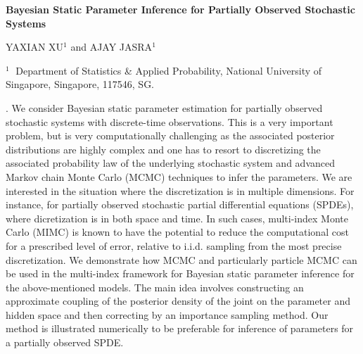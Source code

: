 \documentclass[10.9pt]{article}
\begin{document}
\begin{flushleft}


{\LARGE\bf Bayesian Static Parameter Inference for Partially Observed Stochastic Systems}


\vspace{1.0cm}

YAXIAN XU$^1$ and AJAY JASRA$^1$

\begin{description}

\item $^1 \;$ Department of Statistics \& Applied Probability, National University of Singapore, Singapore, 117546, SG.


\end{description}

\end{flushleft}


\vspace{0.75cm}

. We consider Bayesian static parameter estimation for partially observed stochastic systems with discrete-time observations. This is a very important problem, but is very computationally challenging as the associated posterior distributions are highly complex and one has to resort to discretizing the associated probability law of the underlying stochastic system and advanced Markov chain Monte Carlo (MCMC) techniques to infer the parameters. We are interested in the situation where the discretization is in multiple dimensions. For instance, for partially observed stochastic partial differential equations (SPDEs), where dicretization is in both space and time. In such cases, multi-index Monte Carlo (MIMC) is known to have the potential to reduce the computational cost for a prescribed level of error, relative to i.i.d. sampling from the most precise discretization. We demonstrate how MCMC and particularly particle MCMC can be used in the multi-index framework for Bayesian static parameter inference for the above-mentioned models. The main idea involves constructing an approximate coupling of the posterior density of the joint on the parameter and hidden space and then correcting by an importance sampling method. Our method is illustrated numerically to be preferable for inference of parameters for a partially observed SPDE.

\vskip 2mm
\end{document}
